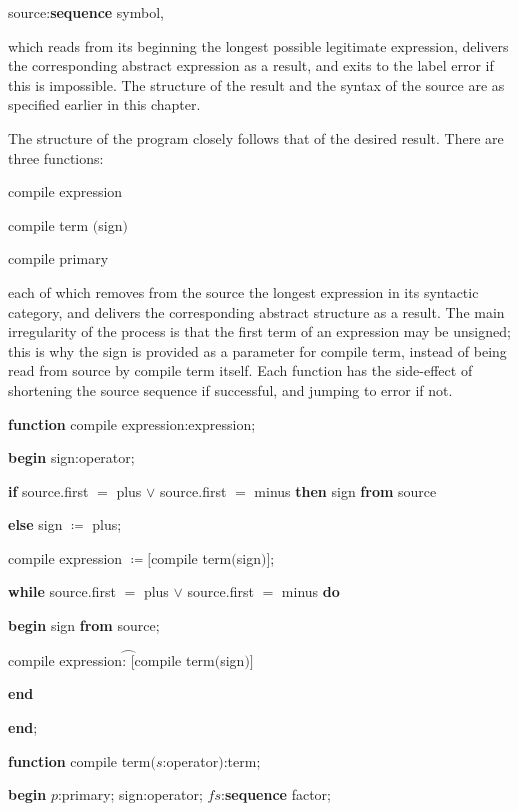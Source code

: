 \quad source:\textbf{sequence} symbol,

\noindent
which reads from its beginning the longest possible legitimate expression, delivers the corresponding abstract expression as a result, and exits to the label error if this is impossible. The structure of the result and the syntax of the source are as specified earlier in this chapter.

The structure of the program closely follows that of the desired result. There are three functions:

\quad compile expression

\quad compile term $($sign$)$

\quad compile primary

\noindent
each of which removes from the source the longest expression in its syntactic category, and delivers the corresponding abstract structure as a result. The main irregularity of the process is that the first term of an expression may be unsigned; this is why the sign is provided as a parameter for compile term, instead of being read from source by compile term itself. Each function has the side-effect of shortening the source sequence if successful, and jumping to error if not.

\noindent
\textbf{function} compile expression:expression;

\noindent
\quad \textbf{begin} sign:operator;

\noindent
\quad \quad \textbf{if} source.first $=$ plus $\vee$ source.first $=$ minus \textbf{then} sign \textbf{from} source

\noindent
\quad \quad \textbf{else} sign $\coloneq$ plus;

\noindent
\quad \quad \quad compile expression $\coloneq [$compile term$($sign$)]$;

\noindent
\quad \quad \quad \textbf{while} source.first $=$ plus $\vee$ source.first $=$ minus \textbf{do}

\noindent
\quad \quad \quad \quad \textbf{begin} sign \textbf{from} source;

\noindent
\quad \quad \quad \quad \quad compile expression$\wideparen{\text{:\ }[}$compile term$($sign$)]$

\noindent
\quad \quad \quad \quad \textbf{end}

\noindent
\quad \textbf{end};

\noindent
\textbf{function} compile term$(s$:operator$)$:term;

\noindent
\quad \textbf{begin} $p$:primary; sign:operator; $fs$:\textbf{sequence} factor;

